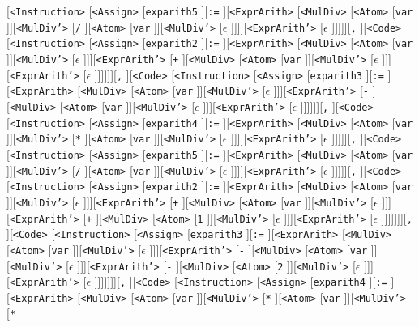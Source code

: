 \documentclass[border=5pt]{standalone}
\begin{document}
[{\texttt{<Instruction>}} [{\texttt{<Assign>}} [{\texttt{exparith5}} ][{\texttt{:=}} ][{\texttt{<ExprArith>}} [{\texttt{<MulDiv>}} [{\texttt{<Atom>}} [{\texttt{var}} ]][{\texttt{<MulDiv'>}} [{\texttt{/}} ][{\texttt{<Atom>}} [{\texttt{var}} ]][{\texttt{<MulDiv'>}} [{$\epsilon$} ]]]][{\texttt{<ExprArith'>}} [{$\epsilon$} ]]]]][{\texttt{,}} ][{\texttt{<Code>}} [{\texttt{<Instruction>}} [{\texttt{<Assign>}} [{\texttt{exparith2}} ][{\texttt{:=}} ][{\texttt{<ExprArith>}} [{\texttt{<MulDiv>}} [{\texttt{<Atom>}} [{\texttt{var}} ]][{\texttt{<MulDiv'>}} [{$\epsilon$} ]]][{\texttt{<ExprArith'>}} [{\texttt{+}} ][{\texttt{<MulDiv>}} [{\texttt{<Atom>}} [{\texttt{var}} ]][{\texttt{<MulDiv'>}} [{$\epsilon$} ]]][{\texttt{<ExprArith'>}} [{$\epsilon$} ]]]]]][{\texttt{,}} ][{\texttt{<Code>}} [{\texttt{<Instruction>}} [{\texttt{<Assign>}} [{\texttt{exparith3}} ][{\texttt{:=}} ][{\texttt{<ExprArith>}} [{\texttt{<MulDiv>}} [{\texttt{<Atom>}} [{\texttt{var}} ]][{\texttt{<MulDiv'>}} [{$\epsilon$} ]]][{\texttt{<ExprArith'>}} [{\texttt{-}} ][{\texttt{<MulDiv>}} [{\texttt{<Atom>}} [{\texttt{var}} ]][{\texttt{<MulDiv'>}} [{$\epsilon$} ]]][{\texttt{<ExprArith'>}} [{$\epsilon$} ]]]]]][{\texttt{,}} ][{\texttt{<Code>}} [{\texttt{<Instruction>}} [{\texttt{<Assign>}} [{\texttt{exparith4}} ][{\texttt{:=}} ][{\texttt{<ExprArith>}} [{\texttt{<MulDiv>}} [{\texttt{<Atom>}} [{\texttt{var}} ]][{\texttt{<MulDiv'>}} [{\texttt{*}} ][{\texttt{<Atom>}} [{\texttt{var}} ]][{\texttt{<MulDiv'>}} [{$\epsilon$} ]]]][{\texttt{<ExprArith'>}} [{$\epsilon$} ]]]]][{\texttt{,}} ][{\texttt{<Code>}} [{\texttt{<Instruction>}} [{\texttt{<Assign>}} [{\texttt{exparith5}} ][{\texttt{:=}} ][{\texttt{<ExprArith>}} [{\texttt{<MulDiv>}} [{\texttt{<Atom>}} [{\texttt{var}} ]][{\texttt{<MulDiv'>}} [{\texttt{/}} ][{\texttt{<Atom>}} [{\texttt{var}} ]][{\texttt{<MulDiv'>}} [{$\epsilon$} ]]]][{\texttt{<ExprArith'>}} [{$\epsilon$} ]]]]][{\texttt{,}} ][{\texttt{<Code>}} [{\texttt{<Instruction>}} [{\texttt{<Assign>}} [{\texttt{exparith2}} ][{\texttt{:=}} ][{\texttt{<ExprArith>}} [{\texttt{<MulDiv>}} [{\texttt{<Atom>}} [{\texttt{var}} ]][{\texttt{<MulDiv'>}} [{$\epsilon$} ]]][{\texttt{<ExprArith'>}} [{\texttt{+}} ][{\texttt{<MulDiv>}} [{\texttt{<Atom>}} [{\texttt{var}} ]][{\texttt{<MulDiv'>}} [{$\epsilon$} ]]][{\texttt{<ExprArith'>}} [{\texttt{+}} ][{\texttt{<MulDiv>}} [{\texttt{<Atom>}} [{\texttt{1}} ]][{\texttt{<MulDiv'>}} [{$\epsilon$} ]]][{\texttt{<ExprArith'>}} [{$\epsilon$} ]]]]]]][{\texttt{,}} ][{\texttt{<Code>}} [{\texttt{<Instruction>}} [{\texttt{<Assign>}} [{\texttt{exparith3}} ][{\texttt{:=}} ][{\texttt{<ExprArith>}} [{\texttt{<MulDiv>}} [{\texttt{<Atom>}} [{\texttt{var}} ]][{\texttt{<MulDiv'>}} [{$\epsilon$} ]]][{\texttt{<ExprArith'>}} [{\texttt{-}} ][{\texttt{<MulDiv>}} [{\texttt{<Atom>}} [{\texttt{var}} ]][{\texttt{<MulDiv'>}} [{$\epsilon$} ]]][{\texttt{<ExprArith'>}} [{\texttt{-}} ][{\texttt{<MulDiv>}} [{\texttt{<Atom>}} [{\texttt{2}} ]][{\texttt{<MulDiv'>}} [{$\epsilon$} ]]][{\texttt{<ExprArith'>}} [{$\epsilon$} ]]]]]]][{\texttt{,}} ][{\texttt{<Code>}} [{\texttt{<Instruction>}} [{\texttt{<Assign>}} [{\texttt{exparith4}} ][{\texttt{:=}} ][{\texttt{<ExprArith>}} [{\texttt{<MulDiv>}} [{\texttt{<Atom>}} [{\texttt{var}} ]][{\texttt{<MulDiv'>}} [{\texttt{*}} ][{\texttt{<Atom>}} [{\texttt{var}} ]][{\texttt{<MulDiv'>}} [{\texttt{*}} 
\end{document}
